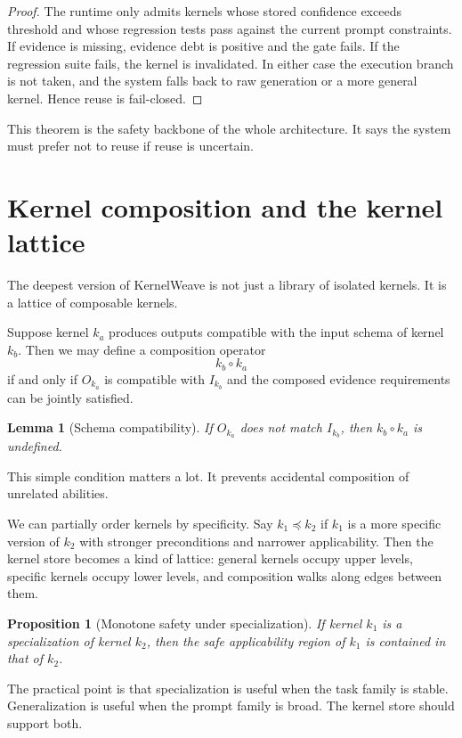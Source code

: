 \documentclass{article}
\newtheorem{proposition}{Proposition}
\newtheorem{lemma}{Lemma}
\begin{document}
\begin{proof}
The runtime only admits kernels whose stored confidence exceeds threshold and whose regression tests pass against the current prompt constraints. If evidence is missing, evidence debt is positive and the gate fails. If the regression suite fails, the kernel is invalidated. In either case the execution branch is not taken, and the system falls back to raw generation or a more general kernel. Hence reuse is fail-closed.
\end{proof}

This theorem is the safety backbone of the whole architecture. It says the system must prefer not to reuse if reuse is uncertain.

\section{Kernel composition and the kernel lattice}

The deepest version of KernelWeave is not just a library of isolated kernels. It is a lattice of composable kernels.

Suppose kernel $k_a$ produces outputs compatible with the input schema of kernel $k_b$. Then we may define a composition operator
\[
 k_b \circ k_a
\]
if and only if $O_{k_a}$ is compatible with $I_{k_b}$ and the composed evidence requirements can be jointly satisfied.

\begin{lemma}[Schema compatibility]
If $O_{k_a}$ does not match $I_{k_b}$, then $k_b \circ k_a$ is undefined.
\end{lemma}

This simple condition matters a lot. It prevents accidental composition of unrelated abilities.

We can partially order kernels by specificity. Say $k_1 \preceq k_2$ if $k_1$ is a more specific version of $k_2$ with stronger preconditions and narrower applicability. Then the kernel store becomes a kind of lattice: general kernels occupy upper levels, specific kernels occupy lower levels, and composition walks along edges between them.

\begin{proposition}[Monotone safety under specialization]
If kernel $k_1$ is a specialization of kernel $k_2$, then the safe applicability region of $k_1$ is contained in that of $k_2$.
\end{proposition}

The practical point is that specialization is useful when the task family is stable. Generalization is useful when the prompt family is broad. The kernel store should support both.
\end{document}
